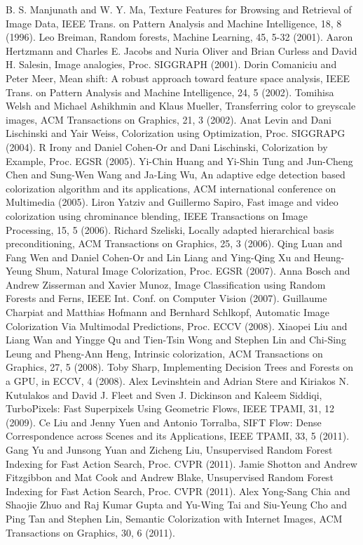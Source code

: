 \documentclass[twocolumn]{svjour3}          %
\begin{document}
\begin{thebibliography}{}
B. S. Manjunath and W. Y. Ma, Texture Features for Browsing and Retrieval of Image Data, IEEE Trans. on Pattern Analysis and Machine Intelligence, 18, 8 (1996).
Leo Breiman, Random forests, Machine Learning, 45, 5-32 (2001).
Aaron Hertzmann and Charles E. Jacobs and  Nuria Oliver and Brian Curless and David H. Salesin, Image analogies, Proc. SIGGRAPH (2001).
Dorin Comaniciu and Peter Meer, Mean shift: A robust approach toward feature space analysis, IEEE Trans. on Pattern Analysis and Machine Intelligence, 24, 5 (2002).
Tomihisa Welsh and Michael Ashikhmin and Klaus Mueller, Transferring color to greyscale images, ACM Transactions on Graphics, 21, 3 (2002).
Anat Levin and  Dani Lischinski and Yair Weiss, Colorization using Optimization, Proc. SIGGRAPG (2004).
R Irony  and  Daniel Cohen-Or and Dani Lischinski, Colorization by Example, Proc. EGSR (2005).
Yi-Chin Huang and Yi-Shin Tung and Jun-Cheng Chen and Sung-Wen Wang and Ja-Ling Wu, An adaptive edge detection based colorization algorithm and its applications, ACM international conference on Multimedia (2005).
Liron Yatziv and Guillermo Sapiro, Fast image and video colorization using chrominance blending, IEEE Transactions on Image Processing, 15, 5 (2006).
Richard Szeliski, Locally adapted hierarchical basis preconditioning, ACM Transactions on Graphics, 25, 3 (2006).
Qing Luan  and  Fang Wen and Daniel Cohen-Or and Lin Liang and Ying-Qing Xu and Heung-Yeung Shum, Natural Image Colorization, Proc. EGSR (2007).
Anna Bosch and Andrew Zisserman and Xavier Munoz, Image Classification using Random Forests and Ferns, IEEE Int. Conf. on Computer Vision (2007).
Guillaume Charpiat and Matthias Hofmann and Bernhard Schlkopf, Automatic Image Colorization Via Multimodal Predictions, Proc. ECCV (2008).
Xiaopei Liu and Liang Wan and Yingge Qu and Tien-Tsin Wong and Stephen Lin and Chi-Sing Leung and Pheng-Ann Heng, Intrinsic colorization, ACM Transactions on Graphics, 27, 5 (2008).
Toby Sharp, Implementing Decision Trees and Forests on a GPU, in ECCV, 4 (2008).
Alex Levinshtein and Adrian Stere and Kiriakos N. Kutulakos and David J. Fleet and Sven J. Dickinson and Kaleem Siddiqi, TurboPixels: Fast Superpixels Using Geometric Flows, IEEE TPAMI, 31, 12 (2009).
Ce Liu and Jenny Yuen and Antonio Torralba, SIFT Flow: Dense Correspondence across Scenes and its Applications, IEEE TPAMI, 33, 5 (2011).
Gang Yu and Junsong Yuan and Zicheng Liu, Unsupervised Random Forest Indexing for Fast Action Search, Proc. CVPR (2011).
Jamie Shotton and Andrew Fitzgibbon and Mat Cook and Andrew Blake, Unsupervised Random Forest Indexing for Fast Action Search, Proc. CVPR (2011).
Alex Yong-Sang Chia and Shaojie Zhuo and Raj Kumar Gupta and Yu-Wing Tai and Siu-Yeung Cho and Ping Tan and Stephen Lin, Semantic Colorization with Internet Images, ACM Transactions on Graphics, 30, 6 (2011).
\end{thebibliography}
\end{document}
